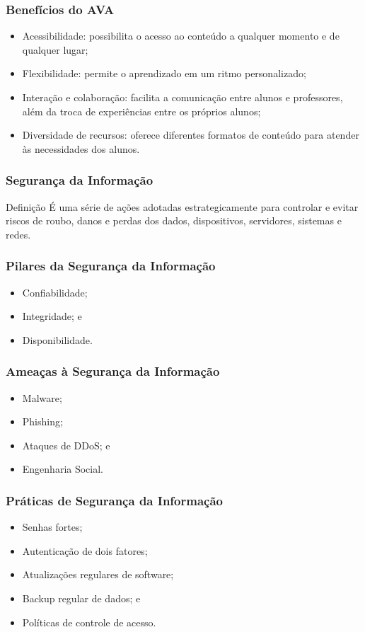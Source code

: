 \documentclass[aspectratio=169]{beamer} %
\begin{document}
\begin{frame}
	\frametitle{Benefícios do AVA}
	
	\begin{itemize}
		\item Acessibilidade: possibilita o acesso ao conteúdo a qualquer momento e de qualquer lugar;
		\item Flexibilidade: permite o aprendizado em um ritmo personalizado;
		\item Interação e colaboração: facilita a comunicação entre alunos e professores, além da troca de experiências entre os próprios alunos;
		\item Diversidade de recursos: oferece diferentes formatos de conteúdo para atender às necessidades dos alunos.
	\end{itemize}
\end{frame}

\begin{frame}
	\frametitle{Segurança da Informação}
	
	\begin{block}{Definição}
		 É uma série de ações adotadas estrategicamente para controlar e evitar riscos de roubo, danos e perdas dos dados, dispositivos, servidores, sistemas e redes.
	\end{block}
\end{frame}

\begin{frame}
	\frametitle{Pilares da Segurança da Informação}

	\begin{itemize}
		\item Confiabilidade;
		\item Integridade; e
		\item Disponibilidade.
	\end{itemize}
\end{frame}

\begin{frame}
	\frametitle{Ameaças à Segurança da Informação}
	
	\begin{itemize}
		\item Malware;
		\item Phishing;
		\item Ataques de DDoS; e
		\item Engenharia Social.
	\end{itemize}
\end{frame}

\begin{frame}
	\frametitle{Práticas de Segurança da Informação}
	
	\begin{itemize}
		\item Senhas fortes;
		\item Autenticação de dois fatores;
		\item Atualizações regulares de software;
		\item Backup regular de dados; e
		\item Políticas de controle de acesso.
	\end{itemize}
\end{frame}
\end{document}
